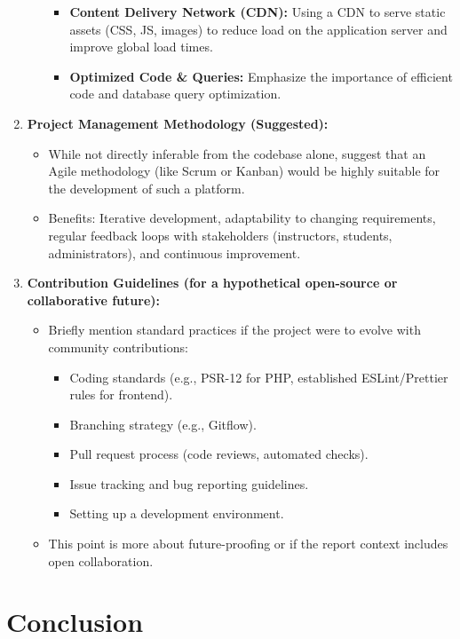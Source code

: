 \begin{enumerate}
\begin{itemize}
\begin{itemize}
            \item \textbf{Content Delivery Network (CDN):} Using a CDN to serve static assets (CSS, JS, images) to reduce load on the application server and improve global load times.
            \item \textbf{Optimized Code \& Queries:} Emphasize the importance of efficient code and database query optimization.
        \end{itemize}
    \end{itemize}
    \item \textbf{Project Management Methodology (Suggested):}
    \begin{itemize}
        \item While not directly inferable from the codebase alone, suggest that an Agile methodology (like Scrum or Kanban) would be highly suitable for the development of such a platform.
        \item Benefits: Iterative development, adaptability to changing requirements, regular feedback loops with stakeholders (instructors, students, administrators), and continuous improvement.
    \end{itemize}
    \item \textbf{Contribution Guidelines (for a hypothetical open-source or collaborative future):}
    \begin{itemize}
        \item Briefly mention standard practices if the project were to evolve with community contributions:
        \begin{itemize}
            \item Coding standards (e.g., PSR-12 for PHP, established ESLint/Prettier rules for frontend).
            \item Branching strategy (e.g., Gitflow).
            \item Pull request process (code reviews, automated checks).
            \item Issue tracking and bug reporting guidelines.
            \item Setting up a development environment.
        \end{itemize}
        \item This point is more about future-proofing or if the report context includes open collaboration.
    \end{itemize}
\end{enumerate}

\section*{Conclusion}

